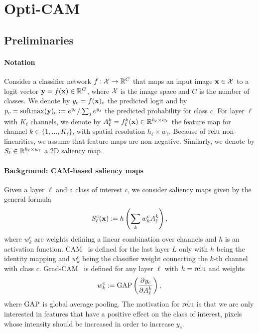 \section{Opti-CAM}
\label{sec:opticam}

\subsection{Preliminaries}
\label{sec:prelim}

\paragraph{Notation}
\label{sec:notation}

Consider a classifier network $f: \mathcal{X} \to \mathbb{R}^C$ that maps an input image $\mathbf{x} \in \mathcal{X}$ to a logit vector $\mathbf{y} = f(\mathbf{x}) \in \mathbb{R}^C$, where $\mathcal{X}$ is the image space and $C$ is the number of classes. We denote by $y_c = f(\mathbf{x})_c$ the predicted logit and by $p_c = \operatorname{softmax}(\mathbf{y})_c \mathrel{:=} e^{y_c} / \sum_j e^{y_j}$ the predicted probability for class $c$. For layer $\ell$ with $K_\ell$ channels, we denote by $A^k_\ell = f^k_\ell(\mathbf{x}) \in \mathbb{R}^{h_\ell \times w_\ell}$ the feature map for channel $k \in \{1,\dots,K_\ell\}$, with spatial resolution $h_\ell \times w_\ell$. Because of $\operatorname{relu}$ non-linearities, we assume that feature maps are non-negative. Similarly, we denote by $S_\ell \in \mathbb{R}^{h_\ell \times w_\ell}$ a 2D saliency map.


\paragraph{Background: CAM-based saliency maps}
\label{sec:back}

Given a layer $\ell$ and a class of interest $c$, we consider saliency maps given by the general formula
\begin{equation}
	S^c_\ell(\mathbf{x}) \mathrel{:=} h \left( \sum_k w^c_k A^k_\ell \right),
\label{eq:sal}
\end{equation}
where $w^c_k$ are weights defining a linear combination over channels and $h$ is an activation function. CAM~\citep{zhou2016learning} is defined for the last layer $L$ only with $h$ being the identity mapping and $w^c_k$ being the classifier weight connecting the $k$-th channel with class $c$. Grad-CAM~\citep{selvaraju2017grad} is defined for any layer $\ell$ with $h = \operatorname{relu}$ and weights
\begin{equation}
	w^c_k \mathrel{:=} \operatorname{GAP} \left( \frac{\partial^{}{y_c}}{\partial{{A^k_\ell}^{}}} \right),
\label{eq:gcam}
\end{equation}
where $\operatorname{GAP}$ is global average pooling.
The motivation for $\operatorname{relu}$ is that we are only interested in features that have a positive effect on the class of interest, \ie pixels whose intensity should be increased in order to increase $y_c$.

